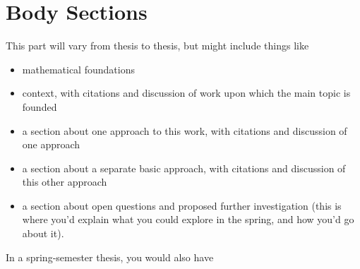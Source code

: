 \section{Body Sections}

This part will vary from thesis to thesis, but might include things like

\begin{itemize}
\item mathematical foundations
\item context, with citations and discussion of work upon which the main topic is founded
\item a section about one approach to this work, with citations and discussion of one approach
\item a section about a separate basic approach, with citations and discussion of this other approach
\item a section about open questions and proposed further investigation (this is where you'd explain what you could explore in the spring, and how you'd go about it).
\end{itemize}

In a spring-semester thesis, you would also have
